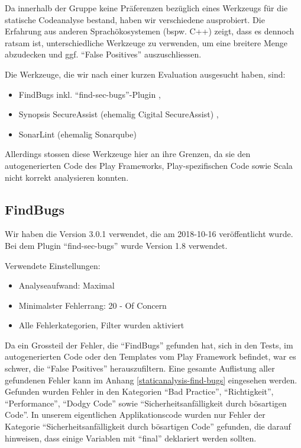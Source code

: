 \documentclass[12pt,DIV14,BCOR10mm,a4paper,parskip=half-,headsepline,headinclude,english,ngerman,bibliography=totocnumbered]{scrreprt}
\begin{document}
Da innerhalb der Gruppe keine Präferenzen bezüglich eines Werkzeugs für die statische Codeanalyse bestand, haben wir verschiedene ausprobiert.
Die Erfahrung aus anderen Sprachökosystemen (bspw. C++) zeigt, dass es dennoch ratsam ist, unterschiedliche Werkzeuge zu verwenden, um eine breitere Menge abzudecken und ggf. \enquote{False Positives} auszuschliessen.

Die Werkzeuge, die wir nach einer kurzen Evaluation ausgesucht haben, sind:

\begin{itemize}
  \item FindBugs \autocite{FindBugs} inkl. \enquote{find-sec-bugs}-Plugin \autocite{FindBugs.FindSecBugs},
  \item Synopsis SecureAssist (ehemalig Cigital SecureAssist) \autocite{SecureAssist},
  \item SonarLint (ehemalig Sonarqube) \autocite{SonarLint}
\end{itemize}

Allerdings stossen diese Werkzeuge hier an ihre Grenzen, da sie den autogenerierten Code des Play Frameworks, Play-spezifischen Code sowie Scala nicht korrekt analysieren konnten.

\subsection{FindBugs}

Wir haben die Version 3.0.1 verwendet, die am 2018-10-16 veröffentlicht wurde.
Bei dem Plugin \enquote{find-sec-bugs} wurde Version 1.8 verwendet.

Verwendete Einstellungen:

\begin{itemize}
  \item Analyseaufwand: Maximal
  \item Minimalster Fehlerrang: 20 - Of Concern
  \item Alle Fehlerkategorien, Filter wurden aktiviert
\end{itemize}

Da ein Grossteil der Fehler, die \enquote{FindBugs} gefunden hat, sich in den Tests, im autogenerierten Code oder den Templates vom Play Framework befindet, war es schwer, die \enquote{False Positives} herauszufiltern.
Eine gesamte Auflistung aller gefundenen Fehler kann im Anhang \ref{staticanalysis-find-bugs} eingesehen werden.
Gefunden wurden Fehler in den Kategorien \enquote{Bad Practice}, \enquote{Richtigkeit}, \enquote{Performance}, \enquote{Dodgy Code} sowie \enquote{Sicherheitsanfälligkeit durch bösartigen Code}.
In unserem eigentlichen Applikationscode wurden nur Fehler der Kategorie \enquote{Sicherheitsanfälligkeit durch bösartigen Code} gefunden, die darauf hinweisen, dass einige Variablen mit \enquote{final} deklariert werden sollten.
\end{document}
